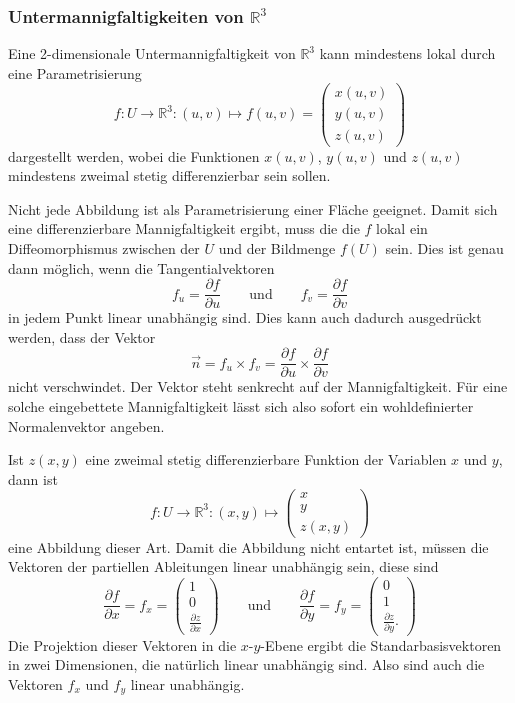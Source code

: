 \subsubsection{Untermannigfaltigkeiten von $\mathbb{R}^3$}
Eine 2-dimensionale Untermannigfaltigkeit von $\mathbb{R}^3$ kann
mindestens lokal durch eine Parametrisierung
\[
f\colon U\to \mathbb{R}^3
:
(u,v)\mapsto f(u,v)
=
\begin{pmatrix}
x(u,v)\\
y(u,v)\\
z(u,v)
\end{pmatrix}
\]
dargestellt werden, wobei die Funktionen $x(u,v)$, $y(u,v)$ und $z(u,v)$
mindestens zweimal stetig differenzierbar sein sollen.

Nicht jede Abbildung ist als Parametrisierung einer Fläche geeignet.
Damit sich eine differenzierbare Mannigfaltigkeit ergibt, muss die die
$f$ lokal ein Diffeomorphismus zwischen der $U$ und der Bildmenge $f(U)$
sein.
Dies ist genau dann möglich, wenn die Tangentialvektoren
\[
f_u
=
\frac{\partial f}{\partial u}
\qquad\text{und}\qquad
f_v
=
\frac{\partial f}{\partial v}
\]
in jedem Punkt linear unabhängig sind.
Dies kann auch dadurch ausgedrückt werden, dass der Vektor
\[
\vec{n}
=
f_u\times f_v
=
\frac{\partial f}{\partial u}
\times
\frac{\partial f}{\partial v}
\]
nicht verschwindet.
Der Vektor steht senkrecht auf der Mannigfaltigkeit.
Für eine solche eingebettete Mannigfaltigkeit lässt sich also sofort
ein wohldefinierter Normalenvektor angeben.

\begin{beispiel}
Ist $z(x,y)$ eine zweimal stetig differenzierbare Funktion der Variablen
$x$ und $y$, dann ist
\[
f\colon
U\to \mathbb{R}^3
:
(x,y) \mapsto \begin{pmatrix}x\\y\\z(x,y)\end{pmatrix}
\]
eine Abbildung dieser Art.
Damit die Abbildung nicht entartet ist, müssen die Vektoren der partiellen
Ableitungen linear unabhängig sein, diese sind
\begin{equation}
\frac{\partial f}{\partial x}
=
f_x
=
\begin{pmatrix}
1\\0\\ \frac{\partial z}{\partial x}
\end{pmatrix}
\qquad\text{und}\qquad
\frac{\partial f}{\partial y}
=
f_y
=
\begin{pmatrix}
0\\1\\ \frac{\partial z}{\partial y}.
\end{pmatrix}
\label{buch:kruemmung:gausskruemmung:eqn:xytangential}
\end{equation}
Die Projektion dieser Vektoren in die $x$-$y$-Ebene ergibt die 
Standarbasisvektoren in zwei Dimensionen, die natürlich linear
unabhängig sind.
Also sind auch die Vektoren $f_x$ und $f_y$ linear unabhängig.
\end{beispiel}

